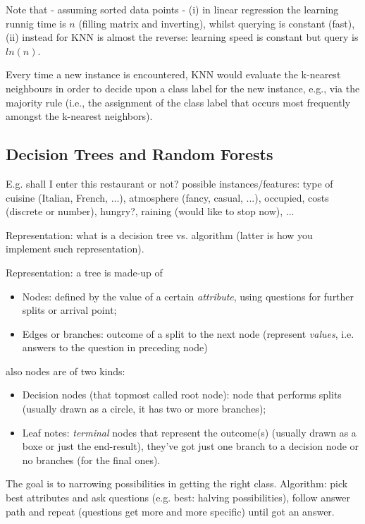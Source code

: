 \documentclass[11pt]{article}
\begin{document}
Note that - assuming sorted data points - (i) in linear regression the learning runnig time is $n$ (filling matrix and inverting), whilst querying is constant (fast), (ii) instead for KNN is almost the reverse: learning speed is constant but query is $ln(n)$. 

Every time a new instance is encountered, KNN would evaluate the k-nearest neighbours in order to decide upon a class label for the new instance, e.g., via the majority rule (i.e., the assignment of the class label that occurs most frequently amongst the k-nearest neighbors).

\subsection{Decision Trees and Random Forests}
E.g. shall I enter this restaurant or not? possible instances/features: type of cuisine (Italian, French, ...), atmosphere (fancy, casual, ...), occupied, costs (discrete or number), hungry?, raining (would like to stop now), ... 

Representation: what is a decision tree vs. algorithm (latter is how you implement such representation).

Representation: a tree is made-up of
\begin{itemize}
	\item Nodes: defined by the value of a certain \textit{attribute}, using questions for further splits or arrival point; 
	\item Edges or branches: outcome of a split to the next node (represent \textit{values}, i.e. answers to the question in preceding node)
\end{itemize}
also nodes are of two kinds:
\begin{itemize}
	\item Decision nodes (that topmost called root node): node that performs splits (usually drawn as a circle, it has two or more branches);
	\item Leaf notes: \textit{terminal} nodes that represent the outcome(s) (usually drawn as a boxe or just the end-result), they've got just one branch to a decision node or no branches (for the final ones).
\end{itemize}

The goal is to narrowing possibilities in getting the right class. Algorithm: pick best attributes and ask questions (e.g. best: halving possibilities), follow answer path and repeat (questions get more and more specific) until got an answer. 
\end{document}
